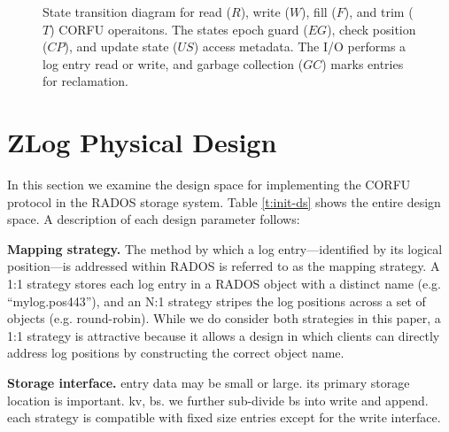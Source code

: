 \documentclass[10pt,twocolumn]{article}
\begin{document}
\begin{figure}
\centering
{}
\caption{State transition diagram for read ($R$), write ($W$), fill ($F$), and
trim ($T$) CORFU operaitons. The states epoch guard ($EG$), check position ($CP$),
and update state ($US$) access metadata. The I/O performs a log entry read or
write, and garbage collection ($GC$) marks entries for reclamation.}
\end{figure}

\section{ZLog Physical Design}

In this section we examine the design space for implementing the CORFU
protocol in the RADOS storage system. Table \ref{t:init-ds} shows the entire
design space. A description of each design parameter follows:

{\bf Mapping strategy.} The method by which a log entry---identified by its
logical position---is addressed within RADOS is referred to as the mapping
strategy. A 1:1 strategy stores each log entry in a RADOS object with a
distinct name (e.g. ``mylog.pos443''), and an N:1 strategy stripes the log
positions across a set of objects (e.g.  round-robin). While we do consider
both strategies in this paper, a 1:1 strategy is attractive because it allows
a design in which clients can directly address log positions by constructing
the correct object name.

{\bf Storage interface.} entry data may be small or large. its primary
storage location is important. kv, bs. we further sub-divide bs into
write and append. each strategy is compatible with fixed size entries
except for the write interface.
\end{document}
